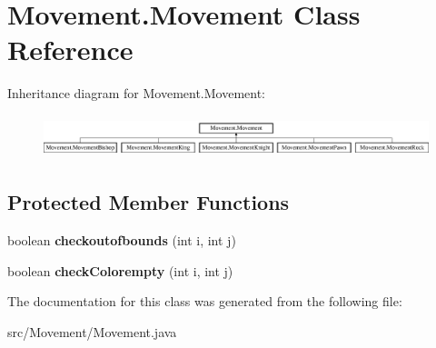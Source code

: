 \hypertarget{class_movement_1_1_movement}{\section{Movement.\-Movement Class Reference}
\label{class_movement_1_1_movement}
}
Inheritance diagram for Movement.\-Movement\-:\begin{figure}[H]
\begin{center}
\leavevmode
\includegraphics[height=1.258427cm]{class_movement_1_1_movement}
\end{center}
\end{figure}
\subsection*{Protected Member Functions}
\begin{DoxyCompactItemize}
\item 
\hypertarget{class_movement_1_1_movement_a74f7e5fbbc387323a207153cd994cc12}{boolean {\bfseries checkoutofbounds} (int i, int j)}\label{class_movement_1_1_movement_a74f7e5fbbc387323a207153cd994cc12}

\item 
\hypertarget{class_movement_1_1_movement_a8ac847fe5ca8f8069ed9967a67443dee}{boolean {\bfseries check\-Colorempty} (int i, int j)}\label{class_movement_1_1_movement_a8ac847fe5ca8f8069ed9967a67443dee}

\end{DoxyCompactItemize}


The documentation for this class was generated from the following file\-:\begin{DoxyCompactItemize}
\item 
src/\-Movement/Movement.\-java\end{DoxyCompactItemize}
